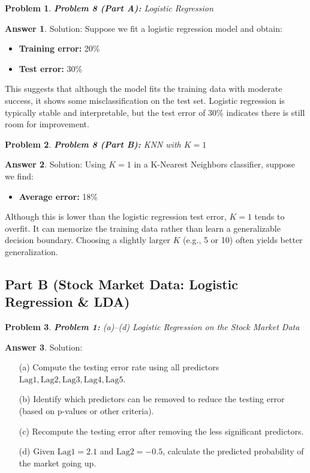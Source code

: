 \documentclass[12pt]{article}
\newtheorem{problem}{Problem} %
\theoremstyle{definition}
\newtheorem*{answer}{Answer}
\newcommand{\solution}{\textcolor{PineGreen}{Solution:\newline}}
\begin{document}
\setcounter{problem}{7}
\begin{problem}
\textbf{Problem 8 (Part A):} Logistic Regression
\end{problem}

\begin{answer}
\solution
Suppose we fit a logistic regression model and obtain:
\begin{itemize}
    \item \textbf{Training error:} 20\%
    \item \textbf{Test error:} 30\%
\end{itemize}
This suggests that although the model fits the training data with moderate success, it shows some misclassification on the test set. Logistic regression is typically stable and interpretable, but the test error of 30\% indicates there is still room for improvement.
\end{answer}

\begin{problem}
\textbf{Problem 8 (Part B):} KNN with \(K=1\)
\end{problem}

\begin{answer}
\solution
Using \(K=1\) in a K-Nearest Neighbors classifier, suppose we find:
\begin{itemize}
    \item \textbf{Average error:} 18\%
\end{itemize}
Although this is lower than the logistic regression test error, \(K=1\) tends to overfit. It can memorize the training data rather than learn a generalizable decision boundary. Choosing a slightly larger \(K\) (e.g., 5 or 10) often yields better generalization.
\end{answer}

\subsection*{Part B (Stock Market Data: Logistic Regression \& LDA)}

\setcounter{problem}{0}
\begin{problem}
\textbf{Problem 1:} (a)--(d) Logistic Regression on the Stock Market Data
\end{problem}

\begin{answer}
\solution
\begin{itemize}
    \item[(a)] Compute the testing error rate using all predictors \(\text{Lag1}, \text{Lag2}, \text{Lag3}, \text{Lag4}, \text{Lag5}\).
    \item[(b)] Identify which predictors can be removed to reduce the testing error (based on p-values or other criteria).
    \item[(c)] Recompute the testing error after removing the less significant predictors.
    \item[(d)] Given \(\text{Lag1} = 2.1\) and \(\text{Lag2} = -0.5\), calculate the predicted probability of the market going up.
\end{itemize}
\end{answer}
\end{document}
